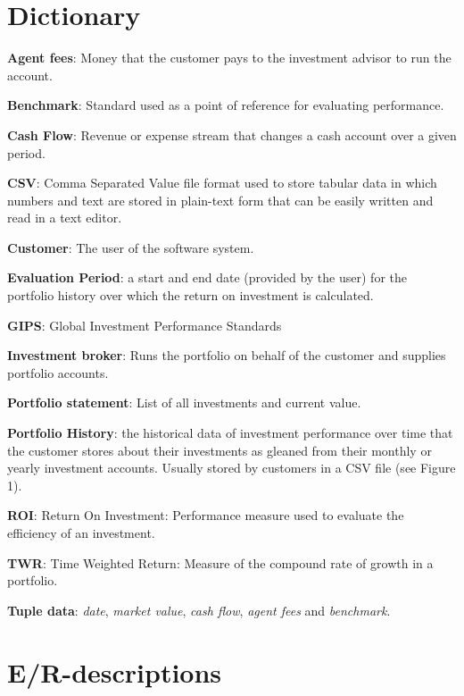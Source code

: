 \documentclass[runningheads,12pt]{article}
\begin{document}
\section{Dictionary}

\smallskip


\noindent\textbf{Agent fees}: Money that the customer pays to the investment advisor to run the account.\smallskip

\noindent\textbf{Benchmark}: Standard used as a point of reference for evaluating performance.\smallskip

\noindent\textbf{Cash Flow}: Revenue or expense stream that changes a cash account over a given period.\smallskip

\noindent\textbf{CSV}: Comma Separated Value file format used to store tabular data in which numbers and text are stored in plain-text form that can be easily written and read in a text editor.\smallskip

\noindent\textbf{Customer}: The user of the software system.\smallskip

\noindent\textbf{Evaluation Period}: a start and end date (provided by the user) for the portfolio history over which the return on investment is calculated.\smallskip

\noindent\textbf{GIPS}: Global Investment Performance Standards\smallskip

\noindent\textbf{Investment broker}: Runs the portfolio on behalf of the customer and supplies portfolio accounts.\smallskip

\noindent\textbf{Portfolio statement}: List of all investments and current value.\smallskip

\noindent\textbf{Portfolio History}: the historical data of investment performance over time that the customer stores about their investments as gleaned from their monthly or yearly investment accounts. Usually stored by customers in a CSV file (see Figure 1).\smallskip

\noindent\textbf{ROI}: Return On Investment: Performance measure used to evaluate the efficiency of an investment.\smallskip

\noindent\textbf{TWR}: Time Weighted Return: Measure of the compound rate of growth in a portfolio.\smallskip

\noindent\textbf{Tuple data}: \textit{date}, \textit{market value}, \textit{cash flow}, \textit{agent fees} and \textit{benchmark}.\smallskip

\section{E/R-descriptions}
\end{document}
